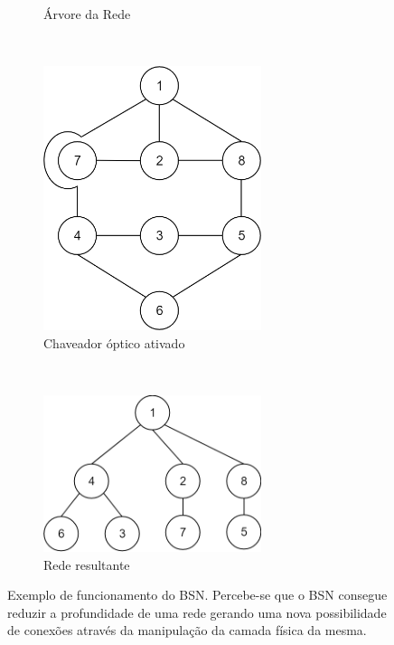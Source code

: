 \documentclass[conference]{IEEEtran}
\begin{document}
\begin{figure}[t!]
\begin{subfigure}[t]{0.2\textwidth}
	\caption{Árvore da Rede}
	\label{BSN-example-network-tree}
	\end{subfigure}
	~
	\begin{subfigure}[t]{0.2\textwidth}
		\centering
		\includegraphics[width=0.7\textwidth]{./figuras/BSN-ex-bypass.png} %
	\caption{Chaveador óptico ativado}
	\label{BSN-example-opt-switch}
	\end{subfigure}
	~
	\begin{subfigure}[t]{0.2\textwidth}
		\centering
		\includegraphics[width=0.7\textwidth]{./figuras/BSN-ex-network-final.png} %
	\caption{Rede resultante}
	\label{BSN-example-rede-otimizada}
	\end{subfigure}
	\caption[Exemplo de funcionamento do BSN]{Exemplo de funcionamento do BSN. Percebe-se que o BSN consegue reduzir a profundidade de uma rede gerando uma nova possibilidade de conexões através da manipulação da camada física da mesma.}
	\label{fig-bsn-exemplo}
\end{figure}
\end{document}
